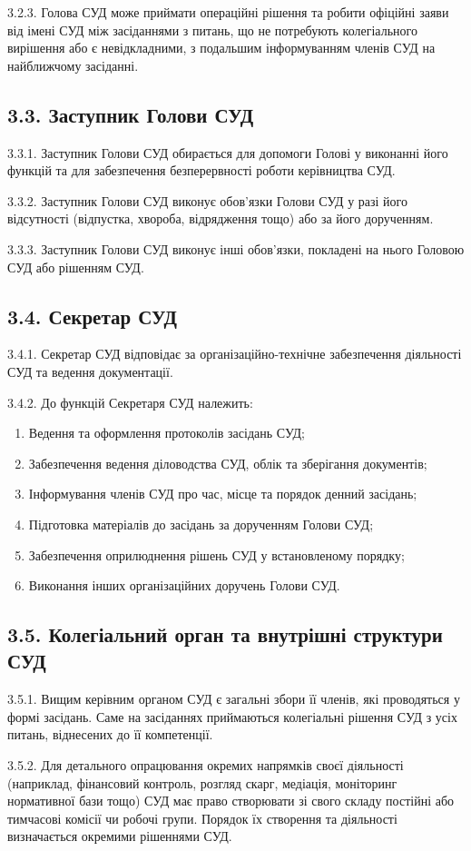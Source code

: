     3.2.3. Голова СУД може приймати операційні рішення та робити офіційні заяви від імені СУД між засіданнями з питань, що не потребують колегіального вирішення або є невідкладними, з подальшим інформуванням членів СУД на найближчому засіданні.

\subsection*{3.3. Заступник Голови СУД}
    3.3.1. Заступник Голови СУД обирається для допомоги Голові у виконанні його функцій та для забезпечення безперервності роботи керівництва СУД.

    3.3.2. Заступник Голови СУД виконує обов'язки Голови СУД у разі його відсутності (відпустка, хвороба, відрядження тощо) або за його дорученням.

    3.3.3. Заступник Голови СУД виконує інші обов'язки, покладені на нього Головою СУД або рішенням СУД.

\subsection*{3.4. Секретар СУД}
    3.4.1. Секретар СУД відповідає за організаційно-технічне забезпечення діяльності СУД та ведення документації.

    3.4.2. До функцій Секретаря СУД належить:

        \begin{enumerate}[label=\alph*)]
            \item Ведення та оформлення протоколів засідань СУД;
            \item Забезпечення ведення діловодства СУД, облік та зберігання документів;
            \item Інформування членів СУД про час, місце та порядок денний засідань;
            \item Підготовка матеріалів до засідань за дорученням Голови СУД;
            \item Забезпечення оприлюднення рішень СУД у встановленому порядку;
            \item Виконання інших організаційних доручень Голови СУД.
        \end{enumerate}

\subsection*{3.5. Колегіальний орган та внутрішні структури СУД}
    3.5.1. Вищим керівним органом СУД є загальні збори її членів, які проводяться у формі засідань. Саме на засіданнях приймаються колегіальні рішення СУД з усіх питань, віднесених до її компетенції.

    3.5.2. Для детального опрацювання окремих напрямків своєї діяльності (наприклад, фінансовий контроль, розгляд скарг, медіація, моніторинг нормативної бази тощо) СУД має право створювати зі свого складу постійні або тимчасові комісії чи робочі групи. Порядок їх створення та діяльності визначається окремими рішеннями СУД.